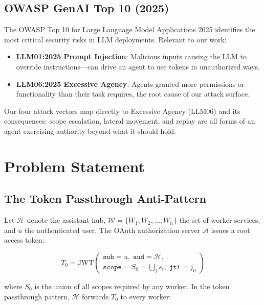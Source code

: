 \documentclass[journal]{IEEEtran}
\begin{document}
\subsection{OWASP GenAI Top 10 (2025)}

The OWASP Top 10 for Large Language Model Applications 2025 \cite{owasp_genai} identifies the most critical security risks in LLM deployments. Relevant to our work:
\begin{itemize}
  \item \textbf{LLM01:2025 Prompt Injection}: Malicious inputs causing the LLM to override instructions—can drive an agent to use tokens in unauthorized ways.
  \item \textbf{LLM06:2025 Excessive Agency}: Agents granted more permissions or functionality than their task requires, the root cause of our attack surface.
\end{itemize}

Our four attack vectors map directly to Excessive Agency (LLM06) and its consequences: scope escalation, lateral movement, and replay are all forms of an agent exercising authority beyond what it should hold.


\section{Problem Statement}
\label{sec:problem}

\subsection{The Token Passthrough Anti-Pattern}

Let $\mathcal{H}$ denote the assistant hub, $\mathcal{W} = \{W_1, W_2, \ldots, W_n\}$ the set of worker services, and $u$ the authenticated user. The OAuth authorization server $\mathcal{A}$ issues a root access token:

\begin{equation}
T_0 = \text{JWT}\!\left(\begin{array}{l}
  \texttt{sub} = u,\;
  \texttt{aud} = \mathcal{H},\\
  \texttt{scope} = S_0 = \bigcup_i s_i,\;
  \texttt{jti} = j_0
\end{array}\right)
\end{equation}

where $S_0$ is the union of all scopes required by any worker. In the token passthrough pattern, $\mathcal{H}$ forwards $T_0$ to every worker:
\end{document}
